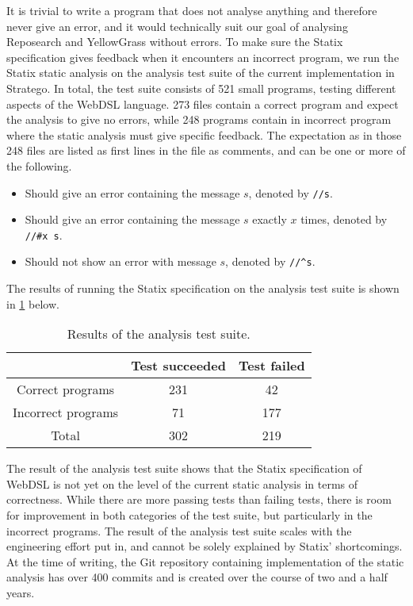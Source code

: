     It is trivial to write a program that does not analyse anything and therefore never give an error, and it would technically suit our goal of analysing Reposearch and YellowGrass without errors. To make sure the Statix specification gives feedback when it encounters an incorrect program, we run the Statix static analysis on the analysis test suite of the current implementation in Stratego. In total, the test suite consists of 521 small programs, testing different aspects of the WebDSL language. 273 files contain a correct program and expect the analysis to give no errors, while 248 programs contain in incorrect program where the static analysis must give specific feedback. The expectation as in those 248 files are listed as first lines in the file as comments, and can be one or more of the following.

    \begin{itemize}
      \item Should give an error containing the message $s$, denoted by \texttt{//s}.
      \item Should give an error containing the message $s$ exactly $x$ times, denoted by \texttt{//\#x s}.
      \item Should not show an error with message $s$, denoted by \texttt{//\^{}s}.
    \end{itemize}

    The results of running the Statix specification on the analysis test suite is shown in \cref{tbl:statix-test-suite-results} below.

    \begin{table}[h]
      \centering
      \begin{tabular}{ | c || c | c | }
        \hline
        & Test succeeded & Test failed \\
        \hline
        Correct programs & 231 & 42 \\
        \hline
        Incorrect programs & 71 & 177 \\
        \hline\hline
        Total & 302 & 219 \\
        \hline
      \end{tabular}
      \caption{\label{tbl:statix-test-suite-results}Results of the analysis test suite.}
    \end{table}

    The result of the analysis test suite shows that the Statix specification of WebDSL is not yet on the level of the current static analysis in terms of correctness. While there are more passing tests than failing tests, there is room for improvement in both categories of the test suite, but particularly in the incorrect programs. The result of the analysis test suite scales with the engineering effort put in, and cannot be solely explained by Statix' shortcomings. At the time of writing, the Git repository containing implementation of the static analysis has over 400 commits and is created over the course of two and a half years.

